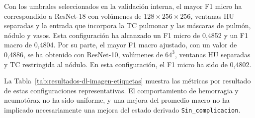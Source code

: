 \begin{table}[!htbp]
\centering
\scriptsize
\caption{Mejor configuración de imagen de cada arquitectura según F1 micro OOF con umbral fijo. M(P,N,V) representa los canales correspondientes a las máscaras de pulmón, nódulo y vasos, respectivamente.}
\label{tab:resultados-dl-imagen-modelos}
\end{table}

Con los umbrales seleccionados en la validación interna, el mayor F1 micro ha correspondido a ResNet-18 con volúmenes de $128 \times 256 \times 256$, ventanas HU separadas y la entrada que incorpora la TC pulmonar y las máscaras de pulmón, nódulo y vasos. Esta configuración ha alcanzado un F1 micro de 0,4852 y un F1 macro de 0,4804. Por su parte, el mayor F1 macro ajustado, con un valor de 0,4886, se ha obtenido con ResNet-10, volúmenes de $64^3$, ventanas HU separadas y TC restringida al nódulo. En esta configuración, el F1 micro ha sido de 0,4802.

La Tabla~\ref{tab:resultados-dl-imagen-etiquetas} muestra las métricas por resultado de estas configuraciones representativas. El comportamiento de hemorragia y neumotórax no ha sido uniforme, y una mejora del promedio macro no ha implicado necesariamente una mejora del estado derivado \texttt{Sin\_complicacion}.


